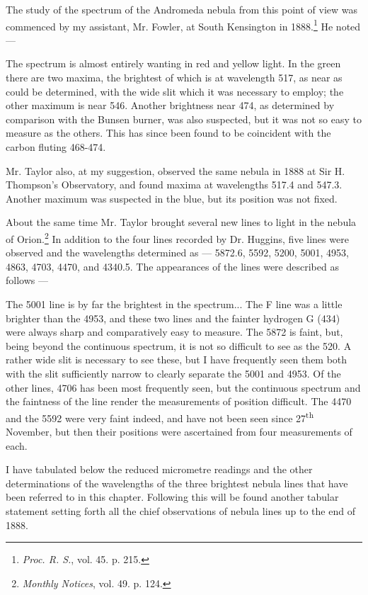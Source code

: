 \documentclass[a4paper, 12pt, oneside, polutonikogreek, english]{article}
\begin{document}
The study of the spectrum of the Andromeda nebula from this point of view was commenced by my assistant, Mr. Fowler, at South Kensington in 1888.\footnote{\emph{Proc. R. S.}, vol. 45. p. 215.} He noted ---

The spectrum is almost entirely wanting in red and yellow light. In the green there are two maxima, the brightest of which is at wavelength 517, as near as could be determined, with the wide slit which it was necessary to employ; the other maximum is near 546. Another brightness near 474, as determined by comparison with the Bunsen burner, was also suspected, but it was not so easy to measure as the others. This has since been found to be coincident with the carbon fluting 468-474.

Mr. Taylor also, at my suggestion, observed the same nebula in 1888 at Sir H. Thompson's Observatory, and found maxima at wavelengths 517.4 and 547.3. Another maximum was suspected in the blue, but its position was not fixed.

About the same time Mr. Taylor brought several new lines to light in the nebula of Orion.\footnote{\emph{Monthly Notices}, vol. 49. p. 124.} In addition to the four lines recorded by Dr. Huggins, five lines were observed and the wavelengths determined as --- 5872.6, 5592, 5200, 5001, 4953, 4863, 4703, 4470, and 4340.5. The appearances of the lines were described as follows ---

The 5001 line is by far the brightest in the spectrum... The F line was a little brighter than the 4953, and these two lines and the fainter hydrogen G (434) were always sharp and comparatively easy to measure. The 5872 is faint, but, being beyond the continuous spectrum, it is not so difficult to see as the 520. A rather wide slit is necessary to see these, but I have frequently seen them both with the slit sufficiently narrow to clearly separate the 5001 and 4953. Of the other lines, 4706 has been most frequently seen, but the continuous spectrum and the faintness of the line render the measurements of position difficult. The 4470 and the 5592 were very faint indeed, and have not been seen since 27\textsuperscript{th} November, but then their positions were ascertained from four measurements of each.

I have tabulated below the reduced micrometre readings and the other determinations of the wavelengths of the three brightest nebula lines that have been referred to in this chapter. Following this will be found another tabular statement setting forth all the chief observations of nebula lines up to the end of 1888.
\end{document}
